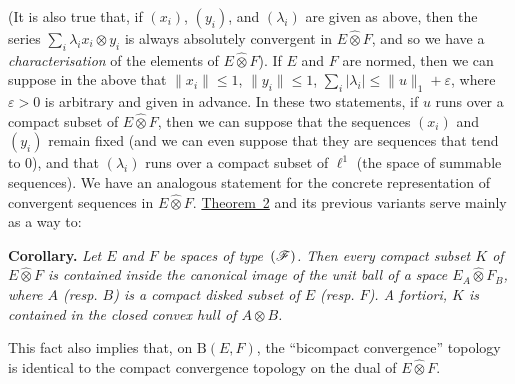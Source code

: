 \documentclass{article}
\theoremstyle{plain}
\newenvironment{itenv}[1]
  {\phantomsection\par\medskip\noindent\textbf{#1.}\itshape}
  {\medskip}
\newcommand{\BB}{\mathrm{B}}
\renewcommand{\ll}{\ell}
\newcommand{\FF}{\mbox{\normalfont($\mathscr{F}$)}}
\newcommand{\hotimes}{\widehat{\otimes}}
\begin{document}
(It is also true that, if $(x_i)$, $(y_i)$, and $(\lambda_i)$ are given as above, then the series $\sum_i\lambda_i x_i\otimes y_i$ is always absolutely convergent in $E\hotimes F$, and so we have a \emph{characterisation} of the elements of $E\hotimes F$).
If $E$ and $F$ are normed, then we can suppose in the above that $\|x_i\|\leq1$, $\|y_i\|\leq1$, $\sum_i|\lambda_i|\leq\|u\|_1+\varepsilon$, where $\varepsilon>0$ is arbitrary and given in advance.
In these two statements, if $u$ runs over a compact subset of $E\hotimes F$, then we can suppose that the sequences $(x_i)$ and $(y_i)$ remain fixed (and we can even suppose that they are sequences that tend to $0$), and that $(\lambda_i)$ runs over a compact subset of $\ll^1$ (the space of summable sequences).
We have an analogous statement for the concrete representation of convergent sequences in $E\hotimes F$.
\hyperref[1.theorem2]{Theorem~2} and its previous variants serve mainly as a way to:
\begin{itenv}{Corollary}
  Let $E$ and $F$ be spaces of type~$\FF$.
  Then every compact subset $K$ of $E\hotimes F$ is contained inside the canonical image of the unit ball of a space $E_A\hotimes F_B$, where $A$ (resp. $B$) is a compact disked subset of $E$ (resp. $F$).
  A fortiori, $K$ is contained in the closed convex hull of $A\otimes B$.
\end{itenv}

This fact also implies that, on $\BB(E,F)$, the ``bicompact convergence'' topology is identical to the compact convergence topology on the dual of $E\hotimes F$.
\end{document}
